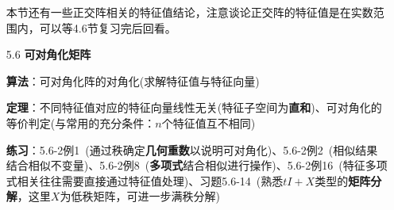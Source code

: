 \documentclass[a4paper,UTF8,fontset=windows]{ctexart}
\newcommand*{\note}{\noindent *}
\begin{document}
\begin{enumerate}
    \note 本节还有一些正交阵相关的特征值结论，注意谈论正交阵的特征值是在实数范围内，可以等4.6节复习完后回看。

    \item[5.6] \textbf{可对角化矩阵}
    
    \textbf{算法}：可对角化阵的对角化(求解特征值与特征向量)

    \textbf{定理}：不同特征值对应的特征向量线性无关(特征子空间为\textbf{直和})、可对角化的等价判定(与常用的充分条件：$n$个特征值互不相同)
    
    \textbf{练习}：5.6-2例1\ (通过秩确定\textbf{几何重数}以说明可对角化)、5.6-2例2\ (相似结果结合相似不变量)、5.6-2例8\ (\textbf{多项式}结合相似进行操作)、5.6-2例16\ (特征多项式相关往往需要直接通过特征值处理)、习题5.6-14\ (熟悉$tI+X$类型的\textbf{矩阵分解}，这里$X$为低秩矩阵，可进一步满秩分解)
\end{enumerate}
\end{document}

